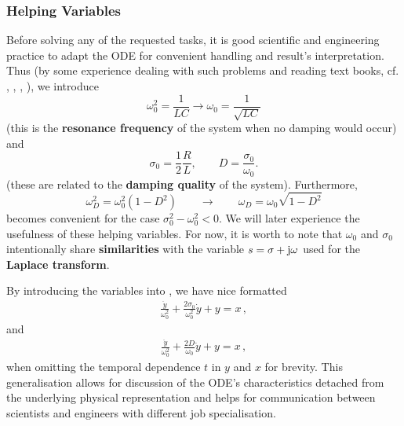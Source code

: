 \documentclass[11pt,a4paper,DIV=12]{scrartcl}
\begin{document}
\subsubsection{Helping Variables}
Before solving any of the requested tasks, it is good scientific and engineering
practice to adapt the ODE for convenient handling and result's interpretation.
Thus (by some experience dealing with such problems and reading text books, cf.
\cite{LangeSigSys1}, \cite{Goeldner1987},  \cite{Oppenheim1997}, \cite{Strang2014}),
we introduce
\begin{equation}
\omega_0^2 = \frac{1}{L C} \rightarrow \omega_0 = \frac{1}{\sqrt{L C}}
\end{equation}
(this is the \textbf{resonance frequency} of the system when no damping would occur)
and
\begin{equation}
\sigma_0 = \frac{1}{2}\frac{R}{L},
\qquad
D = \frac{\sigma_0}{\omega_0}.
\end{equation}
(these are related to the \textbf{damping quality} of the system).
%
Furthermore,
\begin{equation}
\omega_D^2 = \omega_0^2 (1-D^2) \qquad \rightarrow \qquad \omega_D = \omega_0
\sqrt{1-D^2}
\end{equation}
becomes convenient for the case $\sigma_0^2 - \omega_0^2 < 0$.
We will later experience the usefulness of these helping variables.
For now, it is worth to note that $\omega_0$ and $\sigma_0$ intentionally share
\textbf{similarities} with the variable $s=\sigma + \im \omega$ used for the
\textbf{Laplace transform}.

By introducing the variables into , we have nice formatted
\begin{align}
\label{eq:ODE_sigma0}
\boxed{
\frac{\ddot{y}}{\omega_0^2} + \frac{2 \sigma_0}{\omega_0^2} \dot{y} + y = x
}\,,
\end{align}
and
\begin{align}
\label{eq:ODE_D}
\boxed{
\frac{\ddot{y}}{\omega_0^2} + \frac{2 D}{\omega_0} \dot{y} + y = x}\,,
\end{align}
when omitting the temporal dependence $t$ in $y$ and $x$ for brevity.
%
This generalisation allows for discussion of the ODE's characteristics detached
from the underlying physical representation and helps for communication between
scientists and engineers with different job specialisation.



\end{document}
